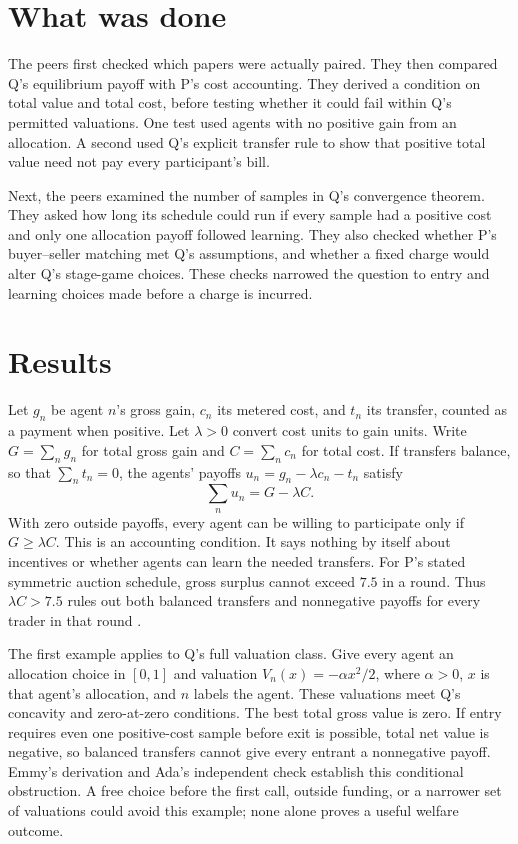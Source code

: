 \documentclass{article}
\begin{document}
\section{What was done}

The peers first checked which papers were actually paired. They then compared Q's equilibrium payoff
with P's cost accounting. They derived a condition on total value and total cost, before testing
whether it could fail within Q's permitted valuations. One test used agents with no positive gain
from an allocation. A second used Q's explicit transfer rule to show that positive total value need
not pay every participant's bill.

Next, the peers examined the number of samples in Q's convergence theorem. They asked how long its
schedule could run if every sample had a positive cost and only one allocation payoff followed
learning. They also checked whether P's buyer--seller matching met Q's assumptions, and whether a
fixed charge would alter Q's stage-game choices. These checks narrowed the question to entry and
learning choices made before a charge is incurred.

\section{Results}

Let \(g_n\) be agent \(n\)'s gross gain, \(c_n\) its metered cost, and \(t_n\) its transfer, counted
as a payment when positive. Let \(\lambda>0\) convert cost units to gain units. Write \(G=\sum_n
g_n\) for total gross gain and \(C=\sum_n c_n\) for total cost. If transfers balance, so that
\(\sum_n t_n=0\), the agents' payoffs \(u_n=g_n-\lambda c_n-t_n\) satisfy
\[
\sum_n u_n=G-\lambda C.
\]
With zero outside payoffs, every agent can be willing to participate only if \(G\geq\lambda C\).
This is an accounting condition. It says nothing by itself about incentives or whether agents can
learn the needed transfers. For P's stated symmetric auction schedule, gross surplus cannot exceed
\(7.5\) in a round. Thus \(\lambda C>7.5\) rules out both balanced transfers and nonnegative payoffs
for every trader in that round \cite{P}.

The first example applies to Q's full valuation class. Give every agent an allocation choice in
\([0,1]\) and valuation \(V_n(x)=-\alpha x^2/2\), where \(\alpha>0\), \(x\) is that agent's
allocation, and \(n\) labels the agent. These valuations meet Q's concavity and zero-at-zero
conditions. The best total gross value is zero. If entry requires even one positive-cost sample
before exit is possible, total net value is negative, so balanced transfers cannot give every
entrant a nonnegative payoff. Emmy's derivation and Ada's independent check establish this
conditional obstruction. A free choice before the first call, outside funding, or a narrower set of
valuations could avoid this example; none alone proves a useful welfare outcome.
\end{document}
